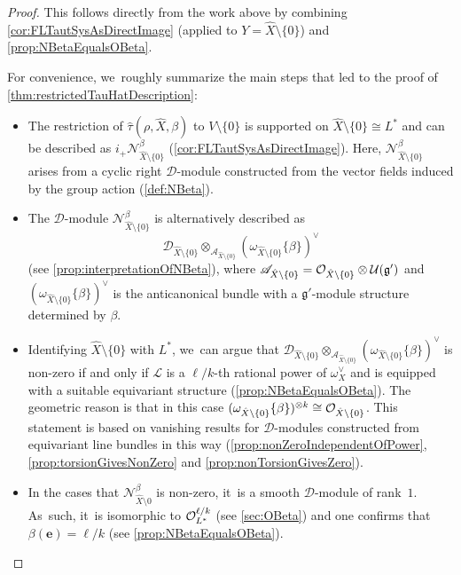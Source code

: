 \documentclass[11pt]{article}
\newcommand{\bme}{{\boldsymbol{e}}}
\newcommand{\cA}{\mathscr{A}}
\newcommand{\Ell}{\mathscr{L}}
\newcommand{\frg}{\mathfrak{g}}
\begin{document}
\begin{proof}
This follows directly from the work above by combining \cref{cor:FLTautSysAsDirectImage} (applied to $Y = \hat X \setminus \{0\}$) and \cref{prop:NBetaEqualsOBeta}.

For convenience, we~roughly summarize the main steps that led to the proof of \cref{thm:restrictedTauHatDescription}:

\begin{itemize}
\item The restriction of $\hat{\tau}(\rho, \hat{X}, \beta)$ to $V \setminus \{0\}$ is supported on $\hat X \setminus \{0\} \cong L^*$ and can be described as $i_+ \mathscr N_{\hat X \setminus \{0\}}^\beta$ (\cref{cor:FLTautSysAsDirectImage}). Here, $\mathscr N_{\hat X \setminus \{0\}}^\beta$ arises from a cyclic right $\mathscr D$\nobreakdash-mod\-ule constructed from the vector fields induced by the group action (\cref{def:NBeta}).
\item The $\mathscr D$\nobreakdash-mod\-ule $\mathscr N_{\hat X \setminus \{0\}}^\beta$ is alternatively described as
\[
\mathscr{D}_{\hat X \setminus \{0\}} \otimes_{\cA_{\hat X \setminus \{0\}}} (\omega_{\hat X \setminus \{0\}}\{\beta\})^\vee
\]
(see \cref{prop:interpretationOfNBeta}), where $\cA_{\hat X \setminus \{0\}} = \O_{\hat X \setminus \{0\}} \otimes \mathcal U(\frg')$ and $(\omega_{\hat X \setminus \{0\}}\{\beta\})^\vee$ is the anticanonical bundle with a $\frg'$\nobreakdash-mod\-ule structure determined by $\beta$.
\item Identifying $\hat X \setminus \{0\}$ with $L^*$, we~can argue that $\mathscr{D}_{\hat X \setminus \{0\}} \otimes_{\cA_{\hat X \setminus \{0\}}} (\omega_{\hat X \setminus \{0\}}\{\beta\})^\vee$ is non-zero if and only if $\Ell$ is a $\ell/k$-th rational power of $\omega_X^\vee$ and is equipped with a suitable equivariant structure (\cref{prop:NBetaEqualsOBeta}). The geometric reason is that in this case $(\omega_{\hat X \setminus \{0\}}\{\beta\})^{\otimes k} \cong \mathcal{O}_{\hat X \setminus \{0\}}$. This statement is based on vanishing results for $\mathscr D$\nobreakdash-mod\-ules constructed from equivariant line bundles in this way (\cref{prop:nonZeroIndependentOfPower}, \cref{prop:torsionGivesNonZero} and \cref{prop:nonTorsionGivesZero}).
\item In the cases that $\mathscr N_{\hat X \setminus 0}^\beta$ is non-zero, it~is a smooth $\mathscr D$\nobreakdash-mod\-ule of rank~$1$. As~such, it~is isomorphic to $\mathcal{O}_{L^*}^{\ell/k}$ (see \cref{sec:OBeta}) and one confirms that $\beta(\bme) = \ell/k$ (see \cref{prop:NBetaEqualsOBeta}). \qedhere
\end{itemize}
\end{proof}
\end{document}
